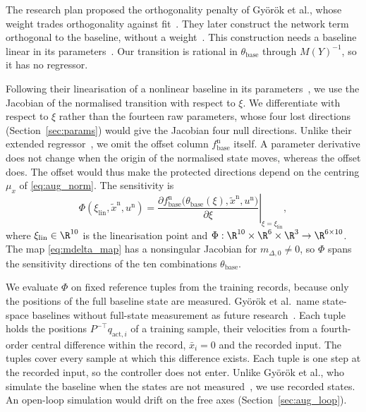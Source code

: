 The research plan proposed the orthogonality penalty of Gy\"or\"ok et al.,
whose weight trades orthogonality against fit~\cite[Eq.~(13), Remark~1]{gyorok2025l4dc}.
They later construct the network term orthogonal to the baseline, without a
weight~\cite[Sec.~3.2]{gyorok2026obc}.
This construction needs a baseline linear in its
parameters~\cite[Eq.~(2)]{gyorok2026obc}.
Our transition is rational in $\theta_{\mathrm{base}}$ through $M(Y)^{-1}$, so
it has no regressor.

Following their linearisation of a nonlinear baseline in its
parameters~\cite[Sec.~4, Eq.~(15)]{gyorok2025l4dc}, we use the Jacobian of the
normalised transition with respect to $\xi$.
We differentiate with respect to $\xi$ rather than the fourteen raw
parameters, whose four lost directions (Section~\ref{sec:params}) would give
the Jacobian four null directions.
Unlike their extended regressor~\cite[Eq.~(18)]{gyorok2025l4dc}, we omit the
offset column $f^{\mathrm n}_{\mathrm{base}}$ itself.
A parameter derivative does not change when the origin of the normalised state
moves, whereas the offset does.
The offset would thus make the protected directions depend on the centring
$\mu_x$ of \eqref{eq:aug_norm}.
The sensitivity is
\begin{equation}
 \Phi(\xi_{\mathrm{lin}},\tilde x^{\mathrm n},u^{\mathrm n})
 =\left.\frac{\partial f^{\mathrm n}_{\mathrm{base}}\bigl(\theta_{\mathrm{base}}(\xi),\tilde x^{\mathrm n},u^{\mathrm n}\bigr)}
   {\partial\xi}\right|_{\xi=\xi_{\mathrm{lin}}},
\label{eq:obc_sens}
\end{equation}
where $\xi_{\mathrm{lin}}\in\R^{10}$ is the linearisation point and
$\Phi:\R^{10}\times\R^6\times\R^3\to\R^{6\times10}$.
The map \eqref{eq:mdelta_map} has a nonsingular Jacobian for
$m_{\Delta,0}\neq0$, so $\Phi$ spans the sensitivity directions of the ten
combinations $\theta_{\mathrm{base}}$.

We evaluate $\Phi$ on fixed reference tuples from the training records,
because only the positions of the full baseline state are measured.
Gy\"or\"ok et al.\ name state-space baselines without full-state measurement as
future research~\cite[Sec.~6]{gyorok2026obc}.
Each tuple holds the positions $P^{-\top}q_{\mathrm{act},i}$ of a training
sample, their velocities from a fourth-order central difference within the
record, $\bar x_i=0$ and the recorded input.
The tuples cover every sample at which this difference exists.
Each tuple is one step at the recorded input, so the controller does not enter.
Unlike Gy\"or\"ok et al., who simulate the baseline when the states are not
measured~\cite[Sec.~3]{gyorok2025l4dc}, we use recorded states.
An open-loop simulation would drift on the free axes
(Section~\ref{sec:aug_loop}).

